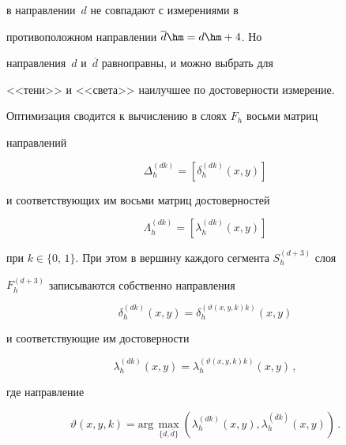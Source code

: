 \noindent


 в направлении~$d$ не совпадают с измерениями в 


противоположном направлении $\overline{d}\hm= d\hm+4$. Но 


направления~$d$ и~$\overline{d}$ равноправны, и можно выбрать для 


<<тени>> и <<света>> наилучшее по достоверности измерение.


  


  Оптимизация сводится к вычислению в слоях $F_h$ восьми матриц 


направлений


  \begin{equation}


  \Delta_h^{(dk)} =\left[ \delta_h^{(dk)}(x,y)\right]


  \label{e16-gk}


  \end{equation}


и соответствующих им восьми матриц достоверностей


\begin{equation}


\Lambda_h^{(dk)} =\left[ \lambda_h^{(dk)} (x,y)\right]


\label{e17-gk}


\end{equation}


при $k\in\{0,\,1\}$. При этом в вершину каждого сегмента $S_h^{(d+3)}$ слоя 


$F_h^{(d+3)}$ записываются собственно направления


$$


\delta_h^{(dk)}(x,y) =\delta_h^{(\vartheta (x,y,k)k)}(x,y)


$$


и соответствующие им достоверности


$$


\lambda_h^{(dk)}(x,y) =\lambda_h^{(\vartheta(x,y,k)k)}(x,y)\,,


$$


где направление


\begin{equation}


\vartheta(x,y,k) =\mathrm{arg}\,\max\limits_{\{d,\overline{d}\}} \left( 


\lambda_h^{(dk)}(x,y),\lambda_h^{(\overline{d}k)}(x,y)\right)\,.


\label{e18-gk}


\end{equation}


